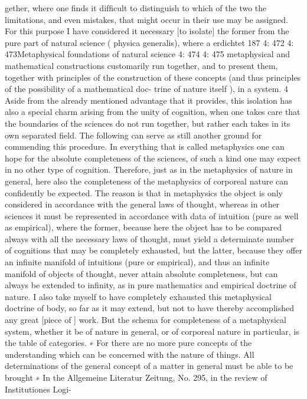 gether, where one ﬁnds it difﬁcult to distinguish to which of the two
the limitations, and even mistakes, that might occur in their use may be
assigned. For this purpose I have considered it necessary [to isolate] the
former from the pure part of natural science ( physica generalis), where
a
erdichtet
187
4: 472
4: 473Metaphysical foundations of natural science
4: 474
4: 475
metaphysical and mathematical constructions customarily run together,
and to present them, together with principles of the construction of these
concepts (and thus principles of the possibility of a mathematical doc-
trine of nature itself ), in a system. 4 Aside from the already mentioned
advantage that it provides, this isolation has also a special charm arising
from the unity of cognition, when one takes care that the boundaries
of the sciences do not run together, but rather each takes in its own
separated ﬁeld.
The following can serve as still another ground for commending this
procedure. In everything that is called metaphysics one can hope for the
absolute completeness of the sciences, of such a kind one may expect in no
other type of cognition. Therefore, just as in the metaphysics of nature
in general, here also the completeness of the metaphysics of corporeal
nature can conﬁdently be expected. The reason is that in metaphysics the
object is only considered in accordance with the general laws of thought,
whereas in other sciences it must be represented in accordance with data
of intuition (pure as well as empirical), where the former, because here the
object has to be compared always with all the necessary laws of thought,
must yield a determinate number of cognitions that may be completely
exhausted, but the latter, because they offer an inﬁnite manifold of
intuitions (pure or empirical), and thus an inﬁnite manifold of objects of
thought, never attain absolute completeness, but can always be extended
to inﬁnity, as in pure mathematics and empirical doctrine of nature. I also
take myself to have completely exhausted this metaphysical doctrine of
body, so far as it may extend, but not to have thereby accomplished any
great [piece of ] work.
But the schema for completeness of a metaphysical system, whether it
be of nature in general, or of corporeal nature in particular, is the table of
categories. ∗ For there are no more pure concepts of the understanding
which can be concerned with the nature of things. All determinations of
the general concept of a matter in general must be able to be brought
∗
In the Allgemeine Literatur Zeitung, No. 295, in the review of Institutiones Logi-
